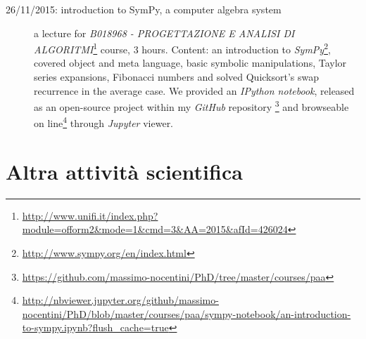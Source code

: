 \documentclass[11pt]{article}
\begin{document}
\begin{description}

\item[26/11/2015: introduction to SymPy, a computer algebra system] a lecture for 
    \emph{B018968 - PROGETTAZIONE E ANALISI DI ALGORITMI}\footnote{\url{http://www.unifi.it/index.php?module=ofform2\&mode=1\&cmd=3\&AA=2015\&afId=426024}} 
    course, 3 hours. Content: an introduction to 
    \emph{SymPy}\footnote{\url{http://www.sympy.org/en/index.html}}, covered object and meta language, basic symbolic 
    manipulations, Taylor series expansions, Fibonacci numbers and solved Quicksort's swap recurrence
    in the average case. We provided an \emph{IPython notebook}, released as an open-source project within
    my \emph{GitHub} repository \footnote{\url{https://github.com/massimo-nocentini/PhD/tree/master/courses/paa}}
    and browseable on line\footnote{\url{http://nbviewer.jupyter.org/github/massimo-nocentini/PhD/blob/master/courses/paa/sympy-notebook/an-introduction-to-sympy.ipynb?flush\_cache=true}} 
    through \emph{Jupyter} viewer.

\end{description}

\section*{Altra attivit\`a scientifica}
\end{document}
